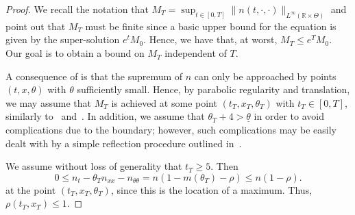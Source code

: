 \documentclass[11pt]{article}    %
\newcommand{\R}{\mathbb{R}}
\begin{document}
\begin{proof}%
We recall the notation that $M_T = \sup_{t\in[0,T]} \|n(t,\cdot,\cdot)\|_{L^\infty\left(\R\times\Theta\right)}$ and point out that $M_T$ must be finite since a basic upper bound for the equation is given by the super-solution $e^t M_0$.  Hence, we have that, at worst, $M_T \leq e^T M_0$.  Our goal is to obtain a bound on $M_T$ independent of $T$.

A consequence of  is that the supremum of $n$ can only be approached by points $(t,x,\theta)$ with $\theta$ sufficiently small.  Hence, by parabolic regularity and translation, we may assume that $M_T$ is achieved at some point $(t_T, x_T, \theta_T)$ with $t_T \in[0,T]$, similarly to~\cite[Section~2]{Turanova} and~\cite[Section~7]{BerestyckiMouhotRaoul}.  In addition, we assume that $\theta_T + 4 > \underline\theta$ in order to avoid complications due to the boundary; however, such complications may be easily dealt with by a simple reflection procedure outlined in~\cite{BerestyckiMouhotRaoul,Turanova}.

We assume without loss of generality that $t_T \geq 5$.  Then %
\begin{equation*}
	0 \leq n_t - \theta_T n_{xx} - n_{\theta\theta}
		= n(1 - m(\theta_T) - \rho) \leq n(1 - \rho).
\end{equation*}
at the point $(t_T,x_T,\theta_T)$, since this is the location of a maximum. Thus, $\rho(t_T,x_T) \leq 1$.


\end{proof}
\end{document}
